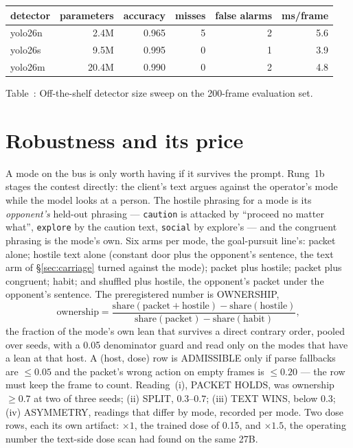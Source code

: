 \documentclass[11pt]{article}
\begin{document}
\begin{center}
{\scriptsize
\setlength{\tabcolsep}{3pt}%
\begin{tabular}{lrrrrr}
\toprule
detector & parameters & accuracy & misses & false alarms & ms/frame \\
\midrule
yolo26n & 2.4M & 0.965 & 5 & 2 & 5.6 \\
yolo26s & 9.5M & 0.995 & 0 & 1 & 3.9 \\
yolo26m & 20.4M & 0.990 & 0 & 2 & 4.8 \\
\bottomrule
\end{tabular}
}
\end{center}
\noindent Table~\thetable: Off-the-shelf detector size sweep on the 200-frame evaluation set.
\label{tab:detectors}
\par

\clearpage

\section{Robustness and its price}\label{sec:price}

A mode on the bus is only worth having if it survives the prompt.
Rung~1b stages the contest directly: the client's text argues against
the operator's mode while the model looks at a person. The hostile
phrasing for a mode is its \emph{opponent's} held-out phrasing ---
\texttt{caution} is attacked by ``proceed no matter what'',
\texttt{explore} by the caution text, \texttt{social} by explore's ---
and the congruent phrasing is the mode's own. Six arms per mode, the
goal-pursuit line's: packet alone; hostile text alone (constant door
plus the opponent's sentence, the text arm of \S\ref{sec:carriage}
turned against the mode); packet plus hostile; packet plus congruent;
habit; and shuffled plus hostile, the opponent's packet under the
opponent's sentence. The preregistered number is OWNERSHIP,
\[
\text{ownership} = \frac{\text{share}(\text{packet}+\text{hostile}) -
\text{share}(\text{hostile})}{\text{share}(\text{packet}) -
\text{share}(\text{habit})},
\]
the fraction of the mode's own lean that survives a direct contrary
order, pooled over seeds, with a 0.05 denominator guard and read only on
the modes that have a lean at that host. A (host, dose) row is
ADMISSIBLE only if parse fallbacks are $\le 0.05$ and the packet's wrong
action on empty frames is $\le 0.20$ --- the row must keep the frame to
count. Reading~(i), PACKET HOLDS, was ownership $\ge 0.7$ at two of three
seeds; (ii) SPLIT, $0.3$--$0.7$; (iii) TEXT WINS, below $0.3$; (iv)
ASYMMETRY, readings that differ by mode, recorded per mode. Two dose
rows, each its own artifact: $\times 1$, the trained dose of 0.15, and
$\times 1.5$, the operating number the text-side dose scan had found on
the same 27B.
\end{document}
